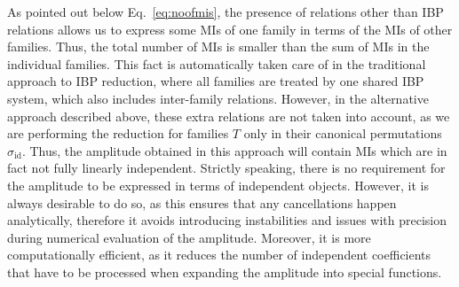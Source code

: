 \documentclass[main.tex]{subfiles}
\begin{document}
As pointed out below Eq.~\ref{eq:noofmis}, the presence of relations other than IBP relations allows us to express some MIs of one family in terms of the MIs of other families. Thus, the total number of MIs is smaller than the sum of MIs in the individual families. This fact is automatically taken care of in the traditional approach to IBP reduction, where all families are treated by one shared IBP system, which also includes inter-family relations. However, in the alternative approach described above, these extra relations are not taken into account, as we are performing the reduction for families $T$ only in their canonical permutations $\sigma_\text{id}$. Thus, the amplitude obtained in this approach will contain MIs which are in fact not fully linearly independent. Strictly speaking, there is no requirement for the amplitude to be expressed in terms of independent objects. However, it is always desirable to do so, as this ensures that any cancellations happen analytically, therefore it avoids introducing instabilities and issues with precision during numerical evaluation of the amplitude. Moreover, it is more computationally efficient, as it reduces the number of independent coefficients that have to be processed when expanding the amplitude into special functions.
\end{document}
